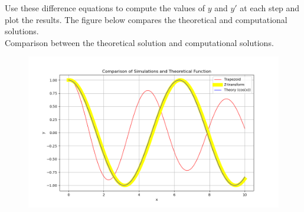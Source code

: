 \documentclass[journal]{IEEEtran}
\begin{document}
Use these difference equations to compute the values of \( y \) and \( y' \) at each step and plot the results. The figure below compares the theoretical and computational solutions.\\
Comparison between the theoretical solution and computational solutions.

\begin{figure}[h!]
   \centering
   \includegraphics[width=\columnwidth]{fig/fig.png}
\end{figure}
\end{document}

